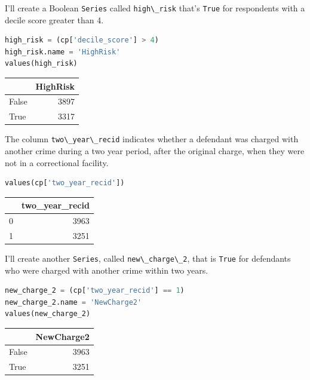 I'll create a Boolean \passthrough{\lstinline!Series!} called
\passthrough{\lstinline!high\_risk!} that's
\passthrough{\lstinline!True!} for respondents with a decile score
greater than 4.

\begin{lstlisting}[language=Python,style=source]
high_risk = (cp['decile_score'] > 4)
high_risk.name = 'HighRisk'
values(high_risk)
\end{lstlisting}

\begin{tabular}{lr}
\toprule
{} &  HighRisk \\
\midrule
False &      3897 \\
True  &      3317 \\
\bottomrule
\end{tabular}

The column \passthrough{\lstinline!two\_year\_recid!} indicates whether
a defendant was charged with another crime during a two year period,
after the original charge, when they were not in a correctional
facility.

\begin{lstlisting}[language=Python,style=source]
values(cp['two_year_recid'])
\end{lstlisting}

\begin{tabular}{lr}
\toprule
{} &  two\_year\_recid \\
\midrule
0 &            3963 \\
1 &            3251 \\
\bottomrule
\end{tabular}

I'll create another \passthrough{\lstinline!Series!}, called
\passthrough{\lstinline!new\_charge\_2!}, that is
\passthrough{\lstinline!True!} for defendants who were charged with
another crime within two years.

\begin{lstlisting}[language=Python,style=source]
new_charge_2 = (cp['two_year_recid'] == 1)
new_charge_2.name = 'NewCharge2'
values(new_charge_2)
\end{lstlisting}

\begin{tabular}{lr}
\toprule
{} &  NewCharge2 \\
\midrule
False &        3963 \\
True  &        3251 \\
\bottomrule
\end{tabular}

